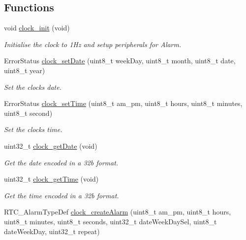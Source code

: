 \subsection*{Functions}
\begin{DoxyCompactItemize}
\item 
void \hyperlink{group___clock_ga78ab77b57cf2e00089f0a3a22508524c}{clock\+\_\+init} (void)
\begin{DoxyCompactList}\small\item\em Initialise the clock to 1\+Hz and setup peripherals for Alarm. \end{DoxyCompactList}\item 
Error\+Status \hyperlink{group___clock_gaf16498fa2702bfda6b89a3335ccc7ca6}{clock\+\_\+set\+Date} (uint8\+\_\+t week\+Day, uint8\+\_\+t month, uint8\+\_\+t date, uint8\+\_\+t year)
\begin{DoxyCompactList}\small\item\em Set the clock\textquotesingle{}s date. \end{DoxyCompactList}\item 
Error\+Status \hyperlink{group___clock_ga11404197d58ddf6b46230bcde4282ef2}{clock\+\_\+set\+Time} (uint8\+\_\+t am\+\_\+pm, uint8\+\_\+t hours, uint8\+\_\+t minutes, uint8\+\_\+t second)
\begin{DoxyCompactList}\small\item\em Set the clock\textquotesingle{}s time. \end{DoxyCompactList}\item 
uint32\+\_\+t \hyperlink{group___clock_gabb4d72928cb3d131d40067fb141003aa}{clock\+\_\+get\+Date} (void)
\begin{DoxyCompactList}\small\item\em Get the date encoded in a 32b format. \end{DoxyCompactList}\item 
uint32\+\_\+t \hyperlink{group___clock_ga03ae6948083c259f6edc0b146f40dc62}{clock\+\_\+get\+Time} (void)
\begin{DoxyCompactList}\small\item\em Get the time encoded in a 32b format. \end{DoxyCompactList}\item 
R\+T\+C\+\_\+\+Alarm\+Type\+Def \hyperlink{group___clock_ga5e1614dbb1a210106dbade3f133db27e}{clock\+\_\+create\+Alarm} (uint8\+\_\+t am\+\_\+pm, uint8\+\_\+t hours, uint8\+\_\+t minutes, uint8\+\_\+t seconds, uint32\+\_\+t date\+Week\+Day\+Sel, uint8\+\_\+t date\+Week\+Day, uint32\+\_\+t repeat)

\end{DoxyCompactItemize}
